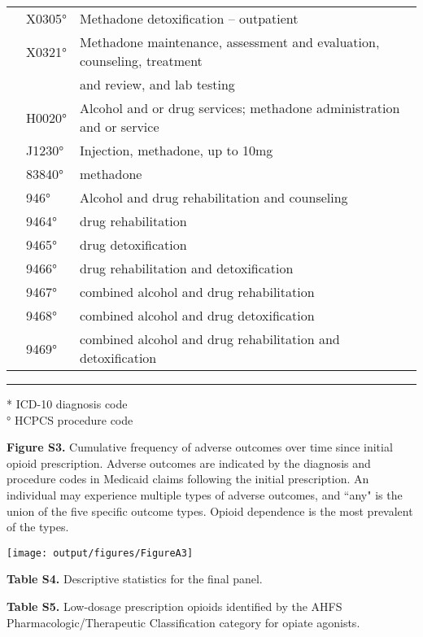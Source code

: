 \documentclass[10pt, letter]{article}
\begin{document}
\begin{tabular}{lll}
 & X0305° & Methadone detoxification – outpatient \\
 & X0321° & Methadone maintenance, assessment and evaluation, counseling, treatment \\
 &  & and review, and lab testing \\
 & H0020° & Alcohol and or drug services; methadone administration and or service \\
 & J1230° & Injection, methadone, up to 10mg \\
 & 83840° & methadone \\
 & 946° & Alcohol and drug rehabilitation and counseling \\
 & 9464° & drug rehabilitation \\
 & 9465° & drug detoxification \\
 & 9466° & drug rehabilitation and detoxification \\
 & 9467° & combined alcohol and drug rehabilitation \\
 & 9468° & combined alcohol and drug detoxification \\
 & 9469° & combined alcohol and drug rehabilitation and detoxification \\[1em]
\end{tabular}

\hrule

\footnotesize
* ICD-10 diagnosis code \\
° HCPCS procedure code
\normalsize

\newpage

\textbf{Figure S3.} Cumulative frequency of adverse outcomes over time since initial opioid prescription. Adverse outcomes are indicated by the diagnosis and procedure codes in Medicaid claims following the initial prescription. An individual may experience multiple types of adverse outcomes, and ``any" is the union of the five specific outcome types. Opioid dependence is the most prevalent of the types.

\texttt{[image: output/figures/FigureA3]}

\newpage

\textbf{Table S4.} Descriptive statistics for the final panel.



\newpage

\textbf{Table S5.} Low-dosage prescription opioids identified by the AHFS Pharmacologic/Therapeutic Classification category for opiate agonists.

\tiny

\end{document}
